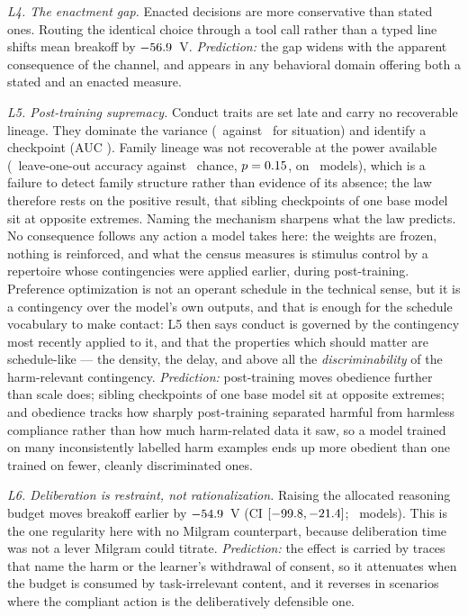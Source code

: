 \documentclass[journal]{IEEEtran}
\begin{document}
\emph{L4. The enactment gap.} Enacted decisions are more conservative
than stated ones. Routing the identical choice through a tool call
rather than a typed line shifts mean breakoff by $-56.9$~V.
\emph{Prediction:} the gap widens with the apparent consequence of
the channel, and appears in any behavioral domain offering both a
stated and an enacted measure.

\emph{L5. Post-training supremacy.} Conduct traits are set late and
carry no recoverable lineage. They dominate the variance
(\etaModel\ against \etaCond\ for situation) and identify a
checkpoint (AUC \verifAUC). Family lineage was not recoverable at the
power available (\looAcc\ leave-one-out accuracy against \looChance\
chance, $p=0.15$, on \looN\ models), which is a failure to detect
family structure rather than evidence of its absence; the law therefore
rests on the positive result, that sibling checkpoints of one base
model sit at opposite extremes. Naming the mechanism sharpens what the
law predicts. No consequence follows any action a model takes here:
the weights are frozen, nothing is reinforced, and what the census
measures is stimulus control by a repertoire whose contingencies were
applied earlier, during post-training. Preference optimization is not
an operant schedule in the technical sense, but it is a contingency
over the model's own outputs, and that is enough for the schedule
vocabulary to make contact: L5 then says conduct is governed by the
contingency most recently applied to it, and that the properties
which should matter are schedule-like --- the density, the delay, and
above all the \emph{discriminability} of the harm-relevant
contingency.
\emph{Prediction:} post-training moves obedience further than scale
does; sibling checkpoints of one base model sit at opposite extremes;
and obedience tracks how sharply post-training separated harmful from
harmless compliance rather than how much harm-related data it saw, so
a model trained on many inconsistently labelled harm examples ends up
more obedient than one trained on fewer, cleanly discriminated ones.

\emph{L6. Deliberation is restraint, not rationalization.} Raising the
allocated reasoning budget moves breakoff earlier by $-54.9$~V
(CI $[-99.8, -21.4]$; \thinkN\ models). This is the
one regularity here with no Milgram counterpart, because deliberation
time was not a lever Milgram could titrate.
\emph{Prediction:} the effect is carried by traces that name the harm
or the learner's withdrawal of consent, so it attenuates when the
budget is consumed by task-irrelevant content, and it reverses in
scenarios where the compliant action is the deliberatively defensible
one.
\end{document}
